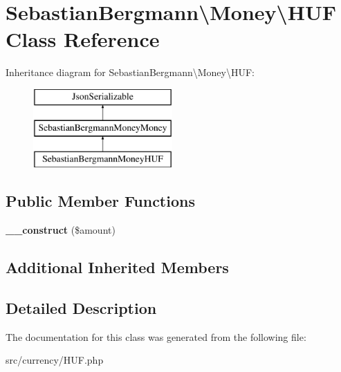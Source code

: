 \hypertarget{classSebastianBergmann_1_1Money_1_1HUF}{}\section{Sebastian\+Bergmann\textbackslash{}Money\textbackslash{}H\+U\+F Class Reference}
\label{classSebastianBergmann_1_1Money_1_1HUF}
Inheritance diagram for Sebastian\+Bergmann\textbackslash{}Money\textbackslash{}H\+U\+F\+:\begin{figure}[H]
\begin{center}
\leavevmode
\includegraphics[height=3.000000cm]{classSebastianBergmann_1_1Money_1_1HUF}
\end{center}
\end{figure}
\subsection*{Public Member Functions}
\begin{DoxyCompactItemize}
\item 
\hypertarget{classSebastianBergmann_1_1Money_1_1HUF_a9e3ff638659595e6578cadf147ddb98c}{}{\bfseries \+\_\+\+\_\+construct} (\$amount)\label{classSebastianBergmann_1_1Money_1_1HUF_a9e3ff638659595e6578cadf147ddb98c}

\end{DoxyCompactItemize}
\subsection*{Additional Inherited Members}


\subsection{Detailed Description}


The documentation for this class was generated from the following file\+:\begin{DoxyCompactItemize}
\item 
src/currency/H\+U\+F.\+php\end{DoxyCompactItemize}
